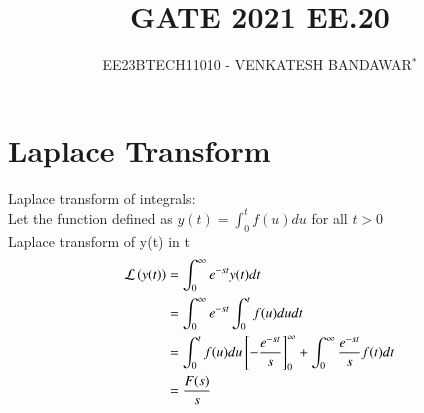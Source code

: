 \documentclass[journal,12pt,twocolumn]{IEEEtran}
\theoremstyle{remark}
\begin{document}

\vspace{3cm}

\title{GATE 2021 EE.20}
\author{EE23BTECH11010 - VENKATESH BANDAWAR$^{*}$%
}
\maketitle
\newpage
\bigskip

\section{Laplace Transform}
Laplace transform of integrals:\\
Let the function defined as $y(t) = \int_0^t f(u) du$ for all $t > 0$\\
Laplace transform of y(t) in t 
\begin{align}
    \mathcal{L} \left(y(t)\right) &= \int_0^{\infty} e^{-st} y(t) dt\\
    &= \int_0^{\infty} e^{-st} \int_0^t f(u) du dt\\
    &= \int_0^t f(u) du {}\left[- \frac{e^{-st}}{s}\right]_0^{\infty} + \int_0^{\infty} \frac{e^{-st}}{s} f(t) dt\\
    &= \frac{F(s)}{s}
\end{align}
\end{document}
